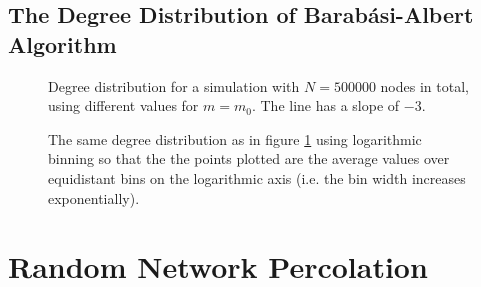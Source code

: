 \documentclass{scrartcl}
\begin{document}
\subsection{The Degree Distribution of Barab\'asi-Albert Algorithm}
\begin{figure}
    \caption{Degree distribution for a simulation with $N=500000$ nodes
    in total, using different values for $m=m_0$. The line has a slope of
    $-3$.}
    \label{fig:22_plot}
\end{figure}
\begin{figure}
    \caption{The same degree distribution as in figure \ref{fig:22_plot}
    using logarithmic binning so that the the points plotted are the average
    values over equidistant bins on the logarithmic axis (i.e. the bin width
    increases exponentially).}
    \label{fig:22_logplot}
\end{figure}
\clearpage
\section{Random Network Percolation}
\end{document}
